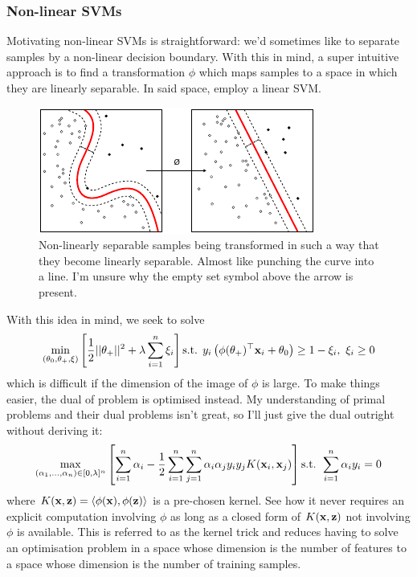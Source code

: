 \documentclass[11pt]{article}
\begin{document}
\subsubsection{Non-linear SVMs}
Motivating non-linear SVMs is straightforward: we'd sometimes like to separate samples by a non-linear decision boundary. With this in mind, a super intuitive approach is to find a transformation $\phi$ which maps samples to a space in which they are linearly separable. In said space, employ a linear SVM.

\begin{figure}[t]
    \centering
    \includegraphics[width=0.75\columnwidth]{./figures/supervised_learning/SVM_non_linear.pdf}
    \caption{Non-linearly separable samples being transformed in such a way that they become linearly separable. Almost like punching the curve into a line. I'm unsure why the empty set symbol above the arrow is present. }
    \label{fig:SVM_non_linear}
\end{figure}

With this idea in mind, we seek to solve
$$
\min_{(\theta_0,\theta_+,\xi)}\left[\frac{1}{2}||\theta_+||^2+\lambda\sum_{i=1}^n\xi_i\right]\text{s.t. } y_i\left(\phi(\theta_+)^\top\mathbf{x}_i+\theta_0\right)\geq 1-\xi_i,\text{ }\xi_i\geq0
$$
which is difficult if the dimension of the image of $\phi$ is large. To make things easier, the dual of problem is optimised instead. My understanding of primal problems and their dual problems isn't great, so I'll just give the dual outright without deriving it:
$$
\max_{(\alpha_1,\dots,\alpha_n)\in[0,\lambda]^n}\left[\sum_{i=1}^n\alpha_i-\frac{1}{2}\sum_{i=1}^n\sum_{j=1}^n\alpha_i\alpha_jy_iy_jK(\mathbf{x}_i,\mathbf{x}_j)\right]\text{s.t. }\sum_{i=1}^n\alpha_iy_i=0
$$
where $K(\mathbf{x},\mathbf{z})=\langle\phi(\mathbf{x}),\phi(\mathbf{z})\rangle$ is a pre-chosen kernel. See how it never requires an explicit computation involving $\phi$ as long as a closed form of $K(\mathbf{x},\mathbf{z})$ not involving $\phi$ is available. This is referred to as the kernel trick and reduces having to solve an optimisation problem in a space whose dimension is the number of features to a space whose dimension is the number of training samples.
\end{document}
